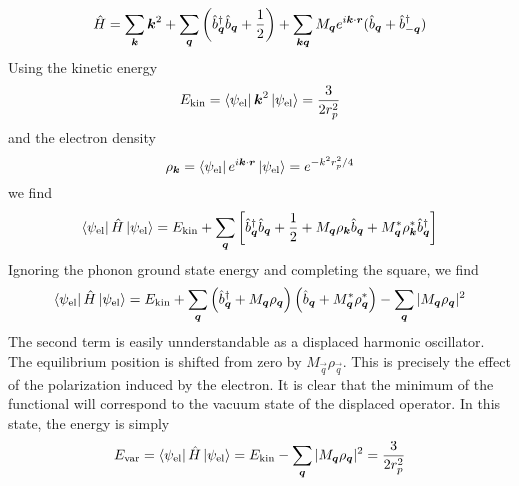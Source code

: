 \begin{equation}
    \hat{H} = \sum_{\mathbf{\boldsymbol{k}}} \mathbf{\boldsymbol{k}}^2
    + \sum_{\mathbf{\boldsymbol{q}}} \left( \hat{b}^\dagger_{ \mathbf{\boldsymbol{q}}} \hat{b}_{ \mathbf{\boldsymbol{q}}} + \frac{1}{2} \right)
    + \sum_{\mathbf{\boldsymbol{k}}\mathbf{\boldsymbol{q}}} M_{\mathbf{\boldsymbol{q}}} e^{i\mathbf{\boldsymbol{k}}\cdot\mathbf{\boldsymbol{r}}} (\hat{b}_{\mathbf{\boldsymbol{q}}} + \hat{b}^\dagger_{-\mathbf{\boldsymbol{q}}})
\end{equation}
Using the kinetic energy
\begin{equation}
    E_\text{kin} = \bra{\psi_\text{el}} \mathbf{\boldsymbol{k}}^2 \ket{\psi_\text{el}}  = \frac{3}{2r_p^2}
\end{equation}
and the electron density
\begin{equation}
    \rho_{\mathbf{\boldsymbol{k}}} = \bra{\psi_\text{el}} e^{i\mathbf{\boldsymbol{k}}\cdot\mathbf{\boldsymbol{r}}} \ket{\psi_\text{el}} = e^{-k^2r_p^2/4}
\end{equation}
we find
\begin{equation}
    \bra{\psi_\text{el}} \hat{H} \ket{\psi_\text{el}} = E_\text{kin} + \sum_{\mathbf{\boldsymbol{q}}} \left[  \hat{b}^\dagger_{ \mathbf{\boldsymbol{q}}} \hat{b}_{ \mathbf{\boldsymbol{q}}} + \frac{1}{2} + M_{\mathbf{\boldsymbol{q}}} \rho_{\mathbf{\boldsymbol{k}}} \hat{b}_{\mathbf{\boldsymbol{q}}} +  M^*_{\mathbf{\boldsymbol{q}}} \rho^*_{\mathbf{\boldsymbol{k}}} \hat{b}^\dagger_{\mathbf{\boldsymbol{q}}} \right]
\end{equation}
Ignoring the phonon ground state energy and completing the square, we find
\begin{equation}
    \bra{\psi_\text{el}} \hat{H} \ket{\psi_\text{el}} = E_\text{kin} + \sum_{\mathbf{\boldsymbol{q}}} \left( \hat{b}^\dagger_{\mathbf{\boldsymbol{q}}} + M_{\mathbf{\boldsymbol{q}}}\rho_{\mathbf{\boldsymbol{q}}} \right)\left( \hat{b}_{\mathbf{\boldsymbol{q}}} + M^*_{\mathbf{\boldsymbol{q}}}\rho^*_{\mathbf{\boldsymbol{q}}} \right) - \sum_{\mathbf{\boldsymbol{q}}} |M_{\mathbf{\boldsymbol{q}}}\rho_{\mathbf{\boldsymbol{q}}}|^2
\end{equation}
The second term is easily unnderstandable as a displaced harmonic oscillator. The equilibrium position is shifted from zero by $M_\vec{q}\rho_\vec{q}$. This is precisely the effect of the polarization induced by the electron. It is clear that the minimum of the functional will correspond to the vacuum state of the displaced operator. In this state, the energy is simply
\begin{equation}
    E_\text{var} = \bra{\psi_\text{el}} \hat{H} \ket{\psi_\text{el}} = E_\text{kin} - \sum_{\mathbf{\boldsymbol{q}}} |M_{\mathbf{\boldsymbol{q}}}\rho_{\mathbf{\boldsymbol{q}}}|^2 = \frac{3}{2r_p^2}
\end{equation}